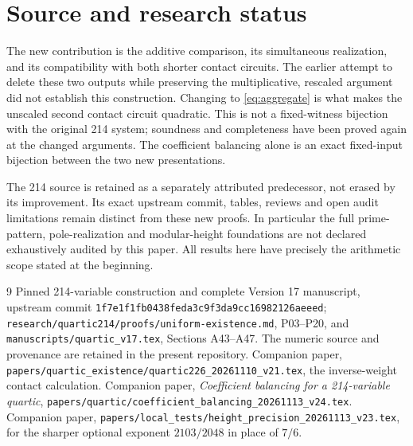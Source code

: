 \documentclass[11pt,a4paper]{article}
\begin{document}
\section{Source and research status}
The new contribution is the additive comparison, its simultaneous
realization, and its compatibility with both shorter contact circuits.
The earlier attempt to delete these two outputs while preserving the
multiplicative, rescaled argument did not establish this construction.
Changing to \eqref{eq:aggregate} is what makes the unscaled second
contact circuit quadratic. This is not a fixed-witness bijection with
the original 214 system; soundness and completeness have been proved
again at the changed arguments. The coefficient balancing alone is
an exact fixed-input bijection between the two new presentations.

The 214 source is retained as a separately attributed predecessor,
not erased by its improvement. Its exact upstream commit, tables,
reviews and open audit limitations remain distinct from these new
proofs. In particular the full prime-pattern, pole-realization and
modular-height foundations are not declared exhaustively audited by
this paper. All results here have precisely the arithmetic scope
stated at the beginning.

\begin{thebibliography}{9}
 Pinned 214-variable construction and complete Version 17
manuscript, upstream commit
\texttt{1f7e1f1fb0438feda3c9f3da9cc16982126aeeed};
\nolinkurl{research/quartic214/proofs/uniform-existence.md}, P03--P20,
and \nolinkurl{manuscripts/quartic_v17.tex}, Sections A43--A47.
The numeric source and provenance are retained in the present repository.
 Companion paper,
\nolinkurl{papers/quartic_existence/quartic226_20261110_v21.tex},
the inverse-weight contact calculation.
 Companion paper, \emph{Coefficient balancing for a
214-variable quartic},
\nolinkurl{papers/quartic/coefficient_balancing_20261113_v24.tex}.
 Companion paper,
\nolinkurl{papers/local_tests/height_precision_20261113_v23.tex},
for the sharper optional exponent $2103/2048$ in place of $7/6$.
\end{thebibliography}
\end{document}
